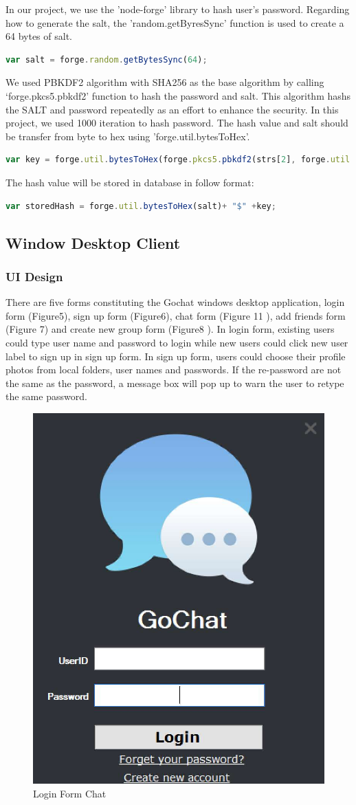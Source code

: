 \documentclass[a4paper,11pt]{article}
\begin{document}
In our project, we use the 'node-forge' library to hash user’s password. Regarding how to generate the salt, the 'random.getByresSync' function is used to create a 64 bytes of salt.
\begin{lstlisting}[language=javascript]
var salt = forge.random.getBytesSync(64);
\end{lstlisting}
We used PBKDF2 algorithm with SHA256 as the base algorithm by calling ‘forge.pkcs5.pbkdf2’ function to hash the password and salt. This algorithm hashs the SALT and password repeatedly as an effort to enhance the security. In this project, we used 1000 iteration to hash password. The hash value and salt should be transfer from byte to hex using 'forge.util.bytesToHex'.
\begin{lstlisting}[language=javascript]
var key = forge.util.bytesToHex(forge.pkcs5.pbkdf2(strs[2], forge.util.bytesToHex(salt), iteration, 32,'sha256'));
\end{lstlisting}
The hash value will be stored in database in follow format:
\begin{lstlisting}[language=javascript]
var storedHash = forge.util.bytesToHex(salt)+ "$" +key;
\end{lstlisting}

\subsection{Window Desktop Client}
\subsubsection{UI Design}
There are five forms constituting the Gochat windows desktop application, login form (Figure5), sign up form (Figure6), chat form (Figure 11 ), add friends form (Figure 7) and create new group form (Figure8 ). In login form, existing users could type user name and password to login while new users could click new user label to sign up in sign up form. In sign up form, users could choose their profile photos from local folders, user names and passwords. If the re-password are not the same as the password, a message box will pop up to warn the user to retype the same password. 

\begin{figure}[h!]
\centering
\includegraphics[width = 0.3 \textwidth ]{login_form.jpg}
\caption{\label{fig:UML}Login Form Chat}
\end{figure}
\end{document}
